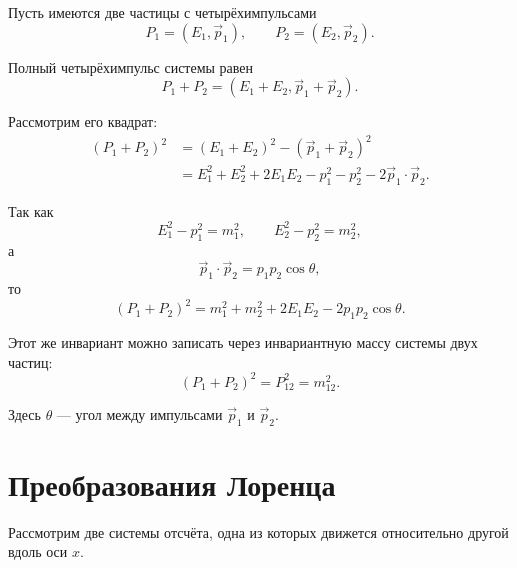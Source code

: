 \documentclass[../final.tex]{subfiles}
\begin{document}
Пусть имеются две частицы с четырёхимпульсами
%
\begin{equation*}
    P_1
    =
    (E_1,\vec p_1),
    \qquad
    P_2
    =
    (E_2,\vec p_2).
\end{equation*}

Полный четырёхимпульс системы равен
%
\begin{equation*}
    P_1+P_2
    =
    (E_1+E_2,\vec p_1+\vec p_2).
\end{equation*}

Рассмотрим его квадрат:
%
\begin{align*}
    (P_1+P_2)^2
    &=
    (E_1+E_2)^2
    -
    (\vec p_1+\vec p_2)^2
    \\[3pt]
    &=
    E_1^2
    +
    E_2^2
    +
    2E_1E_2
    -
    p_1^2
    -
    p_2^2
    -
    2\vec p_1\cdot\vec p_2.
\end{align*}

Так как
%
\begin{equation*}
    E_1^2-p_1^2=m_1^2,
    \qquad
    E_2^2-p_2^2=m_2^2,
\end{equation*}
%
а
%
\begin{equation*}
    \vec p_1\cdot\vec p_2
    =
    p_1p_2\cos\theta,
\end{equation*}
%
то
%
\begin{equation*}
    (P_1+P_2)^2
    =
    m_1^2+m_2^2
    +
    2E_1E_2
    -
    2p_1p_2\cos\theta.
\end{equation*}

Этот же инвариант можно записать через инвариантную массу системы
двух частиц:
%
\begin{equation*}
    (P_1+P_2)^2
    =
    P_{12}^2
    =
    m_{12}^2.
\end{equation*}

Здесь $\theta$ --- угол между импульсами $\vec p_1$ и $\vec p_2$.



\section*{Преобразования Лоренца}

Рассмотрим две системы отсчёта, одна из которых движется относительно
другой вдоль оси $x$.
\end{document}
